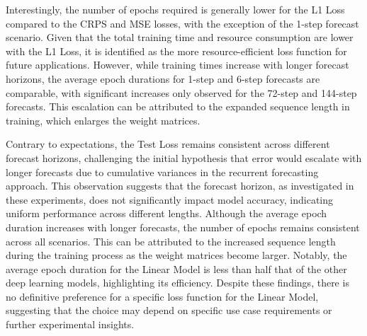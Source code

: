 \documentclass{article}
\begin{document}
Interestingly, the number of epochs required is generally lower for the L1 Loss compared to the CRPS and MSE losses, with the exception of the 1-step forecast scenario. Given that the total training time and resource consumption are lower with the L1 Loss, it is identified as the more resource-efficient loss function for future applications. However, while training times increase with longer forecast horizons, the average epoch durations for 1-step and 6-step forecasts are comparable, with significant increases only observed for the 72-step and 144-step forecasts. This escalation can be attributed to the expanded sequence length in training, which enlarges the weight matrices.

Contrary to expectations, the Test Loss remains consistent across different forecast horizons, challenging the initial hypothesis that error would escalate with longer forecasts due to cumulative variances in the recurrent forecasting approach. This observation suggests that the forecast horizon, as investigated in these experiments, does not significantly impact model accuracy, indicating uniform performance across different lengths. Although the average epoch duration increases with longer forecasts, the number of epochs remains consistent across all scenarios. This can be attributed to the increased sequence length during the training process as the weight matrices become larger. Notably, the average epoch duration for the Linear Model is less than half that of the other deep learning models, highlighting its efficiency. Despite these findings, there is no definitive preference for a specific loss function for the Linear Model, suggesting that the choice may depend on specific use case requirements or further experimental insights.
\end{document}
